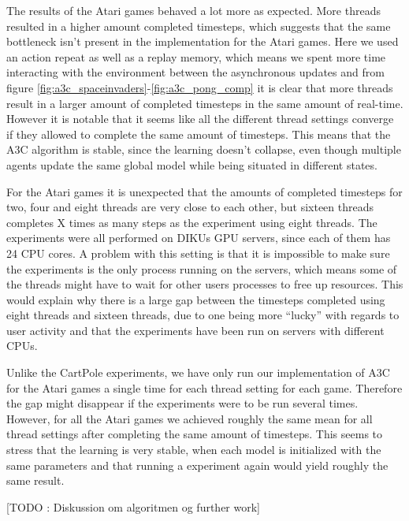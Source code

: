 \documentclass[11pt]{article}
\begin{document}
The results of the Atari games behaved a lot more as expected.
More threads resulted in a higher amount completed timesteps,
which suggests that the same bottleneck isn't present in
the implementation for the Atari games.
Here we used an action repeat as well as a replay memory,
which means we spent more time interacting with the environment
between the asynchronous updates and from figure \ref{fig:a3c_spaceinvaders}-\ref{fig:a3c_pong_comp}
it is clear that more threads result in a larger amount of completed timesteps
in the same amount of real-time.
However it is notable that it seems like all the different thread
settings converge if they allowed to complete the same amount of timesteps.
This means that the A3C algorithm is stable, since the learning
doesn't collapse, even though multiple agents update the same global model
while being situated in different states.


For the Atari games it is unexpected that the amounts of completed timesteps
for two, four and eight threads are very close to each other, but
sixteen threads completes X times as many steps as the experiment using eight
threads.
The experiments were all performed on DIKUs GPU servers, since each of them
has 24 CPU cores.
A problem with this setting is that it is impossible to make sure
the experiments is the only process running on the servers, which means
some of the threads might have to wait for other users processes to
free up resources.
This would explain why there is a large gap between the timesteps
completed using eight threads and sixteen threads, due to one
being more “lucky” with regards to user activity and
that the experiments have been run on servers with different CPUs.

Unlike the CartPole experiments, we have only run our implementation
of A3C for the Atari games a single time for each thread setting for each game.
Therefore the gap might disappear if the experiments were to be run
several times.
However, for all the Atari games we achieved roughly the same mean
for all thread settings after completing the same amount of timesteps.
This seems to stress that the learning is very stable, when each model is initialized
with the same parameters and that running a experiment again would yield
roughly the same result.

[TODO : Diskussion om algoritmen og further work]
\end{document}
